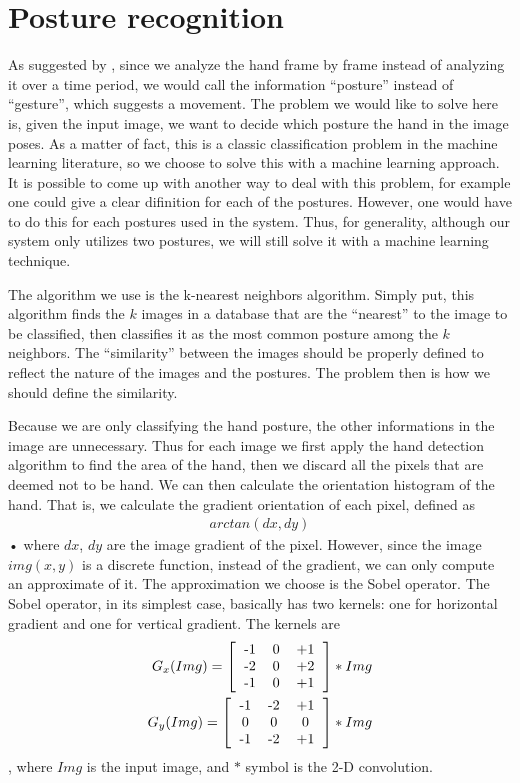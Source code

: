 \section{Posture recognition}
As suggested by \cite{orientation}, since we analyze the hand frame by frame instead of analyzing it over a time period, we would call the information  ``posture'' instead of ``gesture'', which suggests a movement. The problem we would like to solve here is, given the input image, we want to decide which posture the hand in the image poses. As a matter of fact, this is a classic classification problem in the machine learning literature, so we choose to solve this with a machine learning approach. It is possible to come up with another way to deal with this problem, for example one could give a clear difinition for each of the postures. However, one would have to do this for each postures used in the system. Thus, for generality, although our system only utilizes two postures, we will still solve it with a machine learning technique. 

The algorithm we use is the k-nearest neighbors algorithm. Simply put, this algorithm finds the $k$ images in a database that are the ``nearest'' to the image to be classified, then classifies it as the most common posture among the $k$ neighbors. The ``similarity'' between the images should be properly defined to reflect the nature of the images and the postures. The problem then is how we should define the similarity. 

Because we are only classifying the hand posture, the other informations in the image are unnecessary. Thus for each image we first apply the hand detection algorithm to find the area of the hand, then we discard all the pixels that are deemed not to be hand. We can then calculate the orientation histogram of the hand. That is, we calculate the gradient orientation of each pixel, defined as
\begin{align}
arctan(dx, dy)
\end{align}•
where $dx$, $dy$ are the image gradient of the pixel. However, since the image $img(x,y)$ is a discrete function, instead of the gradient, we can only compute an approximate of it. The approximation we choose is the Sobel operator. The Sobel operator, in its simplest case, basically has two kernels: one for horizontal gradient and one for vertical gradient. The kernels are 
\begin{align*}
 G_x(Img) = 
 \left[
  \begin{tabular}{c c c}
   -1&0&+1\\
   -2&0&+2\\
   -1&0&+1\\
  \end{tabular}
 \right]
*Img\\
G_y(Img) =
\left[
\begin{tabular}{c c c}
-1&-2&+1\\
0&0&0\\
-1&-2&+1\\
\end{tabular}
\right]
*Img\\
\end{align*}
, where $Img$ is the input image, and $*$ symbol is the 2-D convolution. 

